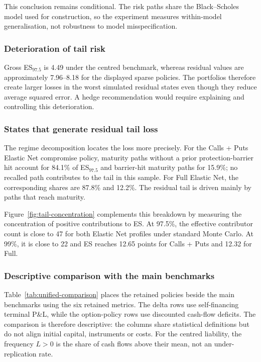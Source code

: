 This conclusion remains conditional. The risk paths share the Black--Scholes
model used for construction, so the experiment measures within-model
generalisation, not robustness to model misspecification.

\subsubsection*{Deterioration of tail risk}

Gross ES$_{97.5}$ is 4.49 under the centred benchmark, whereas residual values
are approximately 7.96--8.18 for the displayed sparse policies. The portfolios
therefore create larger losses in the worst simulated residual states even
though they reduce average squared error. A hedge recommendation would require
explaining and controlling this deterioration.

\subsubsection*{States that generate residual tail loss}

The regime decomposition locates the loss more precisely. For the Calls + Puts
Elastic Net compromise policy, maturity paths without a prior protection-barrier
hit account for 84.1\% of ES$_{97.5}$ and barrier-hit maturity paths for 15.9\%;
no recalled path contributes to the tail in this sample. For Full Elastic Net,
the corresponding shares are 87.8\% and 12.2\%. The residual tail is driven mainly by paths that reach maturity.


Figure~\ref{fig:tail-concentration} complements this breakdown by measuring the concentration of positive contributions to ES. At 97.5\%, the effective contributor count is close to 47 for both Elastic Net profiles under standard Monte Carlo. At 99\%, it is close to 22 and ES reaches 12.65 points for Calls + Puts and 12.32 for Full.

\subsubsection*{Descriptive comparison with the main benchmarks}

Table~\ref{tab:unified-comparison} places the retained policies beside the main
benchmarks using the six retained metrics. The delta rows use self-financing
terminal P\&L, while the option-policy rows use discounted cash-flow deficits.
The comparison is therefore descriptive: the columns share statistical
definitions but do not align initial capital, instruments or costs. For the
centred liability, the frequency $L>0$ is the share of cash flows above their
mean, not an under-replication rate.

